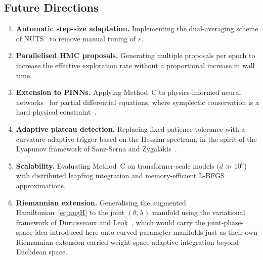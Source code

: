 \documentclass[11pt]{article}
\theoremstyle{definition}
\begin{document}
\subsection*{Future Directions}

\begin{enumerate}[leftmargin=*,label=\arabic*.]

  \item \textbf{Automatic step-size adaptation.} Implementing the
        dual-averaging scheme of NUTS~\cite{hoffman2014nuts} to
        remove manual tuning of $\varepsilon$.

  \item \textbf{Parallelised HMC proposals.} Generating multiple
        proposals per epoch to increase the effective exploration
        rate without a proportional increase in wall time.

  \item \textbf{Extension to PINNs.} Applying Method~C to
        physics-informed neural
        networks~\cite{raissi2019pinns,krishnapriyan2021,wang2023}
        for partial differential equations, where symplectic
        conservation is a hard physical constraint~\cite{kiyani2025}.

  \item \textbf{Adaptive plateau detection.} Replacing fixed
        patience-tolerance with a curvature-adaptive trigger based
        on the Hessian spectrum, in the spirit of the Lyapunov
        framework of Sanz-Serna and
        Zygalakis~\cite{sanzserna2021lyapunov,dobson2025connections}.

  \item \textbf{Scalability.} Evaluating Method~C on transformer-scale
        models ($d\gg10^6$) with distributed leapfrog integration and
        memory-efficient L-BFGS approximations.

  \item \textbf{Riemannian extension.} Generalising the augmented
        Hamiltonian~\eqref{eq:augH} to the joint $(\theta,\lambda)$
        manifold using the variational framework of Duruisseaux and
        Leok~\cite{duruisseaux2022variational}, which would carry
        the joint-phase-space idea introduced here onto curved
        parameter manifolds just as their own Riemannian extension
        carried weight-space adaptive integration beyond Euclidean
        space.

\end{enumerate}

\end{document}
